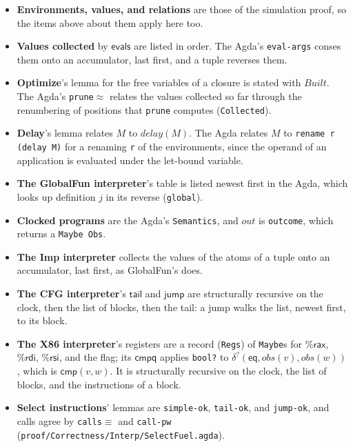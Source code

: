 \documentclass[10pt]{article}
\theoremstyle{acmplain}
\newcommand{\key}[1]{\mathsf{#1}}
\newcommand{\pass}[1]{\mathit{#1}}
\newcommand{\obs}{\mathit{obs}}
\newcommand{\outc}{\mathit{out}}
\newcommand{\rax}{\%\key{rax}}
\newcommand{\rdi}{\%\key{rdi}}
\newcommand{\rsi}{\%\key{rsi}}
\begin{document}
\begin{itemize}
\item \textbf{Environments, values, and relations} are those of the
  simulation proof, so the items above about them apply here too.
\item \textbf{Values collected} by $\key{evals}$ are listed in order. The
  Agda's \texttt{eval-args} conses them onto an accumulator, last first,
  and a tuple reverses them.
\item \textbf{Optimize}'s lemma for the free variables of a closure is
  stated with $\mathit{Built}$. The Agda's \texttt{prune}$\approx$ relates the
  values collected so far through the renumbering of positions that
  \texttt{prune} computes (\texttt{Collected}).
\item \textbf{Delay}'s lemma relates $M$ to $\pass{delay}(M)$. The Agda
  relates $M$ to \texttt{rename r (delay M)} for a renaming \texttt{r}
  of the environments, since the operand of an application is evaluated
  under the let-bound variable.
\item \textbf{The GlobalFun interpreter}'s table is listed newest first in the
  Agda, which looks up definition $j$ in its reverse (\texttt{global}).
\item \textbf{Clocked programs} are the Agda's \texttt{Semantics}, and
  $\outc$ is \texttt{outcome}, which returns a \texttt{Maybe Obs}.
\item \textbf{The Imp interpreter} collects the values of the atoms of a
  tuple onto an accumulator, last first, as GlobalFun's does.
\item \textbf{The CFG interpreter}'s $\key{tail}$ and $\key{jump}$ are
  structurally recursive on the clock, then the list of blocks, then the
  tail: a jump walks the list, newest first, to its block.
\item \textbf{The X86 interpreter}'s registers are a record
  (\texttt{Regs}) of \texttt{Maybe}s for $\rax$, $\rdi$, $\rsi$, and the
  flag; its $\key{cmpq}$ applies \texttt{bool?} to
  $\delta^?(\key{eq}, \obs(v), \obs(w))$, which is $\key{cmp}(v, w)$.
  It is structurally recursive on the clock, the list of blocks, and the
  instructions of a block.
\item \textbf{Select instructions}' lemmas are \texttt{simple-ok},
  \texttt{tail-ok}, and \texttt{jump-ok}, and calls agree by
  \texttt{calls}$\equiv$ and \texttt{call-pw}
  (\texttt{proof/Correctness/Interp/SelectFuel.agda}).
\end{itemize}
\end{document}
